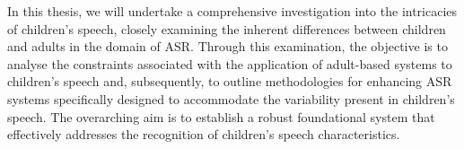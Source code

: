 In this thesis, we will undertake a comprehensive investigation into the intricacies of children's speech, closely examining the inherent differences between children and adults in the domain of ASR. Through this examination, the objective is to analyse the constraints associated with the application of adult-based systems to children's speech and, subsequently, to outline methodologies for enhancing ASR systems specifically designed to accommodate the variability present in children's speech. The overarching aim is to establish a robust foundational system that effectively addresses the recognition of children's speech characteristics.



